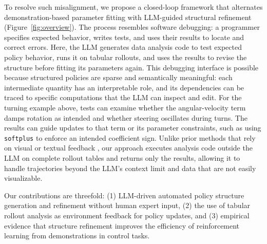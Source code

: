 To resolve such misalignment, we propose a closed-loop framework that alternates demonstration-based parameter fitting with LLM-guided structural refinement (Figure~\ref{fig:overview}).
The process resembles software debugging: a programmer specifies expected behavior, writes tests, and uses their results to locate and correct errors.
Here, the LLM generates data analysis code to test expected policy behavior, runs it on tabular rollouts, and uses the results to revise the structure before fitting its parameters again.
This debugging interface is possible because structured policies are sparse and semantically meaningful: each intermediate quantity has an interpretable role, and its dependencies can be traced to specific computations that the LLM can inspect and edit.
For the turning example above, tests can examine whether the angular-velocity term damps rotation as intended and whether steering oscillates during turns.
The results can guide updates to that term or its parameter constraints, such as using \texttt{softplus} to enforce an intended coefficient sign.
Unlike prior methods that rely on visual \cite{chen2024elemental} or textual feedback \cite{peng2024adaptive}, our approach executes analysis code outside the LLM on complete rollout tables and returns only the results, allowing it to handle trajectories beyond the LLM's context limit and data that are not easily visualizable.

Our contributions are threefold: (1) LLM-driven automated policy structure generation and refinement without human expert input, (2) the use of tabular rollout analysis as environment feedback for policy updates, and (3) empirical evidence that structure refinement improves the efficiency of reinforcement learning from demonstrations in control tasks.

